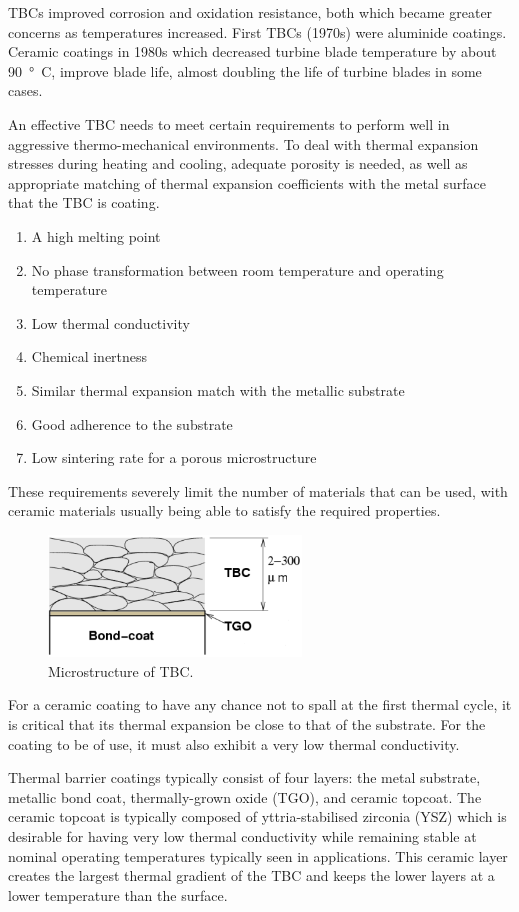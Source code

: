 TBCs improved corrosion and oxidation resistance, both which became greater concerns as temperatures increased. First TBCs (1970s) were aluminide coatings. Ceramic coatings in 1980s which decreased turbine blade temperature by about \SI{90}{\degree C}, improve blade life, almost doubling the life of turbine blades in some cases.

An effective TBC needs to meet certain requirements to perform well in aggressive thermo-mechanical environments. To deal with thermal expansion stresses during heating and cooling, adequate porosity is needed, as well as appropriate matching of thermal expansion coefficients with the metal surface that the TBC is coating.
\begin{enumerate}
    \item A high melting point
    \item No phase transformation between room temperature and operating temperature
    \item Low thermal conductivity
    \item Chemical inertness
    \item Similar thermal expansion match with the metallic substrate
    \item Good adherence to the substrate
    \item Low sintering rate for a porous microstructure
\end{enumerate}
These requirements severely limit the number of materials that can be used, with ceramic materials usually being able to satisfy the required properties.
\begin{figure}[H]
    \centering
    \includegraphics[width =0.6\textwidth]{img/figure29.png}
    \caption{Microstructure of TBC.}
\end{figure}
For a ceramic coating to have any chance not to spall at the first thermal cycle, it is critical that its thermal expansion be close to that of the substrate. For the coating to be of use, it must also exhibit a very low thermal conductivity.

Thermal barrier coatings typically consist of four layers: the metal substrate, metallic bond coat, thermally-grown oxide (TGO), and ceramic topcoat. The ceramic topcoat is typically composed of yttria-stabilised zirconia (YSZ) which is desirable for having very low thermal conductivity while remaining stable at nominal operating temperatures typically seen in applications. This ceramic layer creates the largest thermal gradient of the TBC and keeps the lower layers at a lower temperature than the surface.

